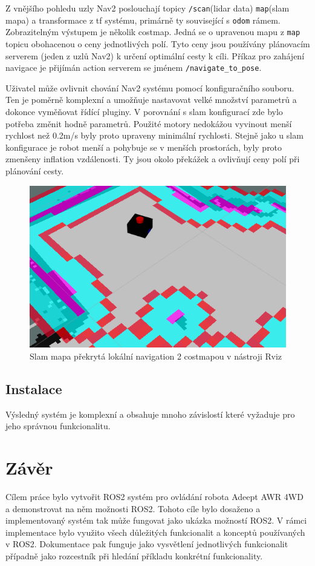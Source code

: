 Z vnějšího pohledu uzly Nav2 poslouchají topicy \verb|/scan|(lidar data) \verb|map|(slam mapa) a transformace z tf systému, primárně ty související s \verb|odom| rámem. Zobrazitelným výstupem je několik costmap. Jedná se o upravenou mapu z \verb|map| topicu obohacenou o ceny jednotlivých polí. Tyto ceny jsou používány plánovacím serverem (jeden z uzlů Nav2) k určení optimální cesty k cíli. Příkaz pro zahájení navigace je přijímán action serverem se jménem \verb|/navigate_to_pose|. 

Uživatel může ovlivnit chování Nav2 systému pomocí konfiguračního souboru. Ten je poměrně komplexní a umožňuje nastavovat velké množství parametrů a dokonce vyměňovat řídící pluginy. V porovnání s slam konfigurací zde bylo potřeba změnit hodně parametrů. Použité motory nedokážou vyvinout menší rychlost než 0.2m/s byly proto upraveny minimální rychlosti. Stejně jako u slam konfigurace je robot menší a pohybuje se v menších prostorách, byly proto zmenšeny inflation vzdálenosti. Ty jsou okolo překážek a ovlivňují ceny polí při plánování cesty.

\begin{figure}[h!]
	\centering
	\includegraphics[scale=0.7]{obrazky-figures/nav2.png}
	\caption{Slam mapa překrytá lokální navigation 2 costmapou v nástroji Rviz}
	\label{}
\end{figure}

\section*{Instalace}
Výsledný systém je komplexní a obsahuje mnoho závislostí které vyžaduje pro jeho správnou funkcionalitu.

\chapter{Závěr}
Cílem práce bylo vytvořit ROS2 systém pro ovládání robota Adeept AWR 4WD a demonstrovat na něm možnosti ROS2. Tohoto cíle bylo dosaženo a implementovaný systém tak může fungovat jako ukázka možností ROS2. V rámci implementace bylo využito všech důležitých funkcionalit a konceptů používaných v ROS2. Dokumentace pak funguje jako vysvětlení jednotlivých funkcionalit případně jako rozcestník při hledání příkladu konkrétní funkcionality.

